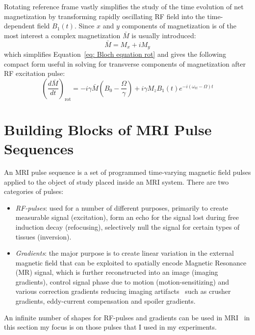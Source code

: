 Rotating reference frame vastly simplifies the study of the time evolution of net magnetization by transforming rapidly oscillating RF field into the time-dependent field $B_1(t)$. 
Since $x$ and $y$ components of magnetization is of the most interest a complex magnetization $\bar{M}$ is usually introduced:
\begin{equation}\label{eq: Transverse magnetization}
	\bar{M}=M_x+iM_y
\end{equation}
which simplifies Equation~\ref{eq: Bloch equation rot} and gives the following compact form useful in solving for transverse components of magnetization after RF excitation pulse:
\begin{equation}\label{eq: Bloch transverse}
	\left(\frac{d\bar{M}}{dt}\right)_\mathrm{rot}=-i\gamma\bar{M}\left(B_0-\frac{\Omega}{\gamma}\right)+i\gamma M_z
B_1(t)e^{-i(\omega_{\mathrm{rf}}-\Omega)t}
\end{equation}
\section{Building Blocks of MRI Pulse Sequences}
An MRI pulse sequence is a set of programmed time-varying magnetic field pulses applied to the object of study placed inside an MRI system. 
There are two categories of pulses: 
\begin{itemize}
\item \textit{RF-pulses}: used for a number of different purposes, primarily to create measurable signal (excitation), form an echo for the signal lost during free induction decay (refocusing), selectively null the signal for certain types of tissues (inversion).
\item \textit{Gradients}: the major purpose is to create linear variation in the external magnetic field that can be exploited to spatially encode Magnetic Resonance (MR) signal, which is further reconstructed into an image (imaging gradients), control signal phase due to motion (motion-sensitizing) and various correction gradients reducing imaging artifacts~\cite{RNDT24} such as crusher gradients, eddy-current compensation and spoiler gradients. 
\end{itemize}
An infinite number of shapes for RF-pulses and gradients can be used in MRI~\cite{RNDT24, Brown:2014uy} in this section my focus is on those pulses that I used in my experiments.
